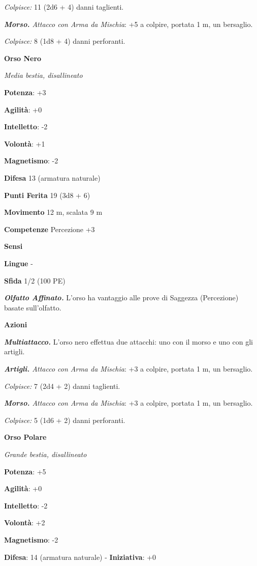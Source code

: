 \begin{multicols}{2}
\emph{Colpisce:} 11 (2d6 + 4) danni taglienti.

\emph{\textbf{Morso.} Attacco con Arma da Mischia}: +5 a colpire,
portata 1 m, un bersaglio.

\emph{Colpisce:} 8 (1d8 + 4) danni perforanti.

\textbf{Orso Nero}

\emph{Media bestia, disallineato}

\textbf{Potenza}: +3

\textbf{Agilità}: +0

\textbf{Intelletto}: -2

\textbf{Volontà}: +1

\textbf{Magnetismo}: -2

\textbf{Difesa} 13 (armatura naturale)

\textbf{Punti Ferita} 19 (3d8 + 6)

\textbf{Movimento} 12 m, scalata 9 m

\textbf{Competenze} Percezione +3

\textbf{Sensi} 

\textbf{Lingue} -

\textbf{Sfida} 1/2 (100 PE)\smallskip

\emph{\textbf{Olfatto Affinato.}} L'orso ha vantaggio alle prove di
Saggezza (Percezione) basate sull'olfatto.

\smallskip\textbf{Azioni}

\emph{\textbf{Multiattacco.}} L'orso nero effettua due attacchi: uno con
il morso e uno con gli artigli.

\emph{\textbf{Artigli.} Attacco con Arma da Mischia}: +3 a colpire,
portata 1 m, un bersaglio.

\emph{Colpisce:} 7 (2d4 + 2) danni taglienti.

\emph{\textbf{Morso.} Attacco con Arma da Mischia}: +3 a colpire,
portata 1 m, un bersaglio.

\emph{Colpisce:} 5 (1d6 + 2) danni perforanti.

\textbf{Orso Polare}

\emph{Grande bestia, disallineato}

\textbf{Potenza}: +5

\textbf{Agilità}: +0

\textbf{Intelletto}: -2

\textbf{Volontà}: +2

\textbf{Magnetismo}: -2

\textbf{Difesa}: 14 (armatura naturale) - \textbf{Iniziativa}: +0


\end{multicols}
